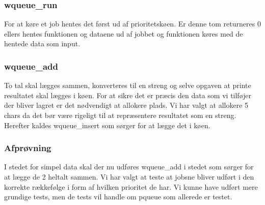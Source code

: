 \documentclass[titlepage]{article}
\begin{document}
    \subsubsection{wqueue\_run}
      For at køre et job hentes det først ud af prioritetskøen.
      Er denne tom returneres 0 ellers hentes funktionen og dataene ud af jobbet og funktionen køres med de hentede data som input.
    \subsubsection{wqueue\_add}
      To tal skal lægges sammen, konverteres til en streng og selve opgaven at printe resultatet skal lægges i køen. For at sikre det er præcis den data som vi tilføjer der bliver lagret er det nødvendigt at allokere plads. Vi har valgt at allokere 5 chars da det bør være rigeligt til at repræsentere resultatet som en streng. Herefter kaldes wqueue\_insert som sørger for at lægge det i køen.

    \subsubsection{Afprøvning}
     I stedet for simpel data skal der nu udføres wqueue\_add i stedet som sørger for at lægge de 2 heltalt sammen. Vi har valgt at teste at jobsne bliver udført i den korrekte rækkefølge i form af hvilken prioritet de har. Vi kunne have udført mere grundige tests, men de tests vil handle om pqueue som allerede er testet.
\end{document}
